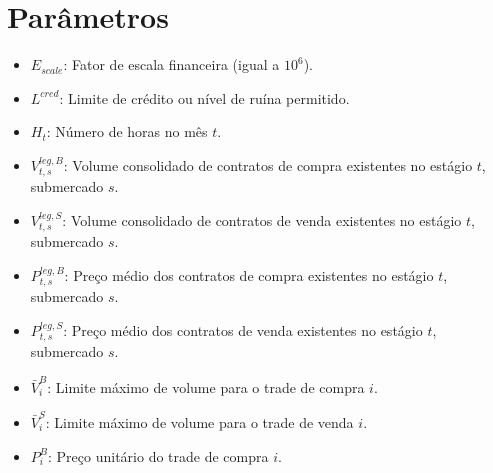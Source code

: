 \documentclass{article}
\begin{document}
\section{Parâmetros}
\begin{itemize}
    \item $E_{scale}$: Fator de escala financeira (igual a $10^6$).
    
    \item $L^{cred}$: Limite de crédito ou nível de ruína permitido.
    
    \item $H_t$: Número de horas no mês $t$.
    
    \item $V^{leg, B}_{t,s}$: Volume consolidado de contratos de compra existentes no estágio $t$, submercado $s$.
    
    \item $V^{leg, S}_{t,s}$: Volume consolidado de contratos de venda existentes no estágio $t$, submercado $s$.
    
    \item $P^{leg, B}_{t,s}$: Preço médio dos contratos de compra existentes no estágio $t$, submercado $s$.
    
    \item $P^{leg, S}_{t,s}$: Preço médio dos contratos de venda existentes no estágio $t$, submercado $s$.
    
    \item $\bar{V}^{B}_{i}$: Limite máximo de volume para o trade de compra $i$.
    
    \item $\bar{V}^{S}_{i}$: Limite máximo de volume para o trade de venda $i$.
    
    \item $P^{B}_{i}$: Preço unitário do trade de compra $i$.
    

\end{itemize}
\end{document}

